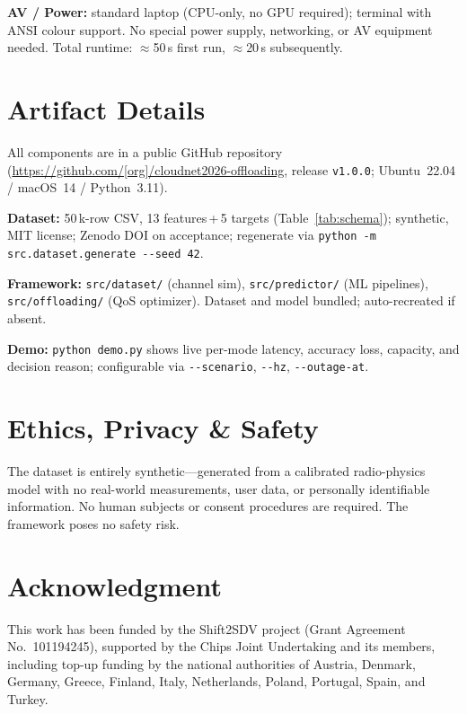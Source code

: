 \documentclass[10pt,conference]{IEEEtran}
\begin{document}
\textbf{AV / Power:} standard laptop (CPU-only, no GPU required); terminal
with ANSI colour support.  No special power supply, networking, or AV
equipment needed.  Total runtime: $\approx$50\,s first run, $\approx$20\,s
subsequently.

\section{Artifact Details}

All components are in a public GitHub repository
(\url{https://github.com/[org]/cloudnet2026-offloading}, release
\texttt{v1.0.0}; Ubuntu~22.04 / macOS~14 / Python~3.11).

\textbf{Dataset:} 50\,k-row CSV, 13 features\,+\,5 targets
(Table~\ref{tab:schema}); synthetic, MIT license; Zenodo DOI on
acceptance; regenerate via
\texttt{python -m src.dataset.generate -{}-seed 42}.

\textbf{Framework:} \texttt{src/dataset/} (channel sim),
\texttt{src/predictor/} (ML pipelines), \texttt{src/offloading/}
(QoS optimizer).  Dataset and model bundled; auto-recreated if absent.

\textbf{Demo:} \texttt{python demo.py} shows live per-mode latency,
accuracy loss, capacity, and decision reason; configurable via
\texttt{-{}-scenario}, \texttt{-{}-hz}, \texttt{-{}-outage-at}.

\section{Ethics, Privacy \& Safety}

The dataset is entirely synthetic---generated from a calibrated radio-physics
model with no real-world measurements, user data, or personally identifiable
information.  No human subjects or consent procedures are required.  The
framework poses no safety risk.

\section*{Acknowledgment}

This work has been funded by the Shift2SDV project (Grant Agreement
No.~101194245), supported by the Chips Joint Undertaking and its members,
including top-up funding by the national authorities of Austria, Denmark,
Germany, Greece, Finland, Italy, Netherlands, Poland, Portugal, Spain, and
Turkey.
\end{document}
